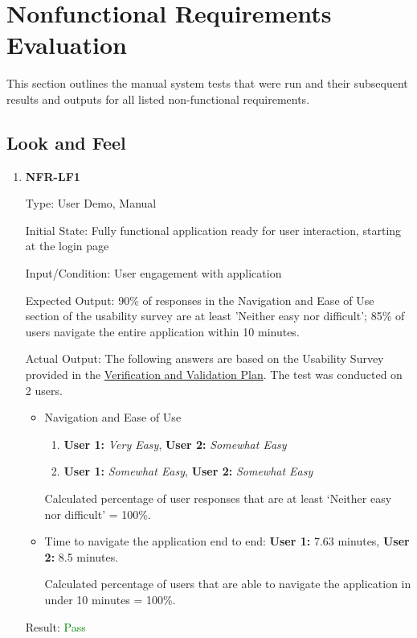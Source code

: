 \documentclass[12pt, titlepage]{article}
\begin{document}
\section{Nonfunctional Requirements Evaluation}
This section outlines the manual system tests that were run and their subsequent
results and outputs for all listed non-functional requirements.
\subsection{Look and Feel} \label{NFR-LF}
\begin{enumerate}
\item{\textbf{NFR-LF1}} \label{NFR:LF1}

Type: User Demo, Manual

Initial State: Fully functional application ready for user interaction, starting
at the login page

Input/Condition: User engagement with application

Expected Output: 90\% of responses in the Navigation and Ease of Use section of
the usability survey are at least 'Neither easy nor difficult'; 85\% of users
navigate the entire application within 10 minutes.

Actual Output: \newline
The following answers are based on the Usability Survey provided in the
\href{https://github.com/SumanyaG/Alkalytics/blob/main/docs/VnVPlan/VnVPlan.pdf}
{Verification and Validation Plan}. The test was conducted on 2 users.
\begin{itemize}
  \item Navigation and Ease of Use
  \begin{enumerate}
    \item \textbf{User 1:} \emph{Very Easy}, \textbf{User 2:} \emph{Somewhat
    Easy}
    \item \textbf{User 1:} \emph{Somewhat Easy}, \textbf{User 2:} \emph{Somewhat
    Easy}
  \end{enumerate}
  Calculated percentage of user responses that are at least `Neither easy nor
  difficult' = 100\%.
  \item Time to navigate the application end to end: \textbf{User 1:} 7.63
  minutes, \textbf{User 2:} 8.5 minutes.
  
  Calculated percentage of users that are able to navigate the application in
  under 10 minutes = 100\%.
\end{itemize}

Result: \textcolor{green}{Pass}


\end{enumerate}
\end{document}
